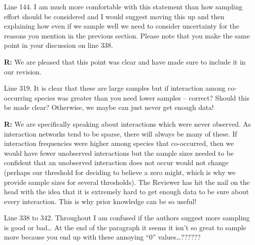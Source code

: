 \documentclass[12pt]{letter}
\newenvironment{refquote}{\bigskip \begin{it}}{\end{it}\smallskip}
\begin{document}
\begin{itemize}
		\begin{refquote}
		Line 144.  I am much more comfortable with this statement than how sampling effort should be considered and I would suggest moving this up and then explaining how even if we sample well we need to consider uncertainty for the reasons you mention in the previous section.  Please note that you make the same point in your discussion on line 338.
		\end{refquote}

		\textbf{R:} We are pleased that this point was clear and have made sure to include it in our revision.

		\begin{refquote}
		Line 319.  It is clear that these are large samples but if interaction among co-occurring species was greater than you need lower samples – correct?  Should this be made clear?  Otherwise, we maybe can just never get enough data!
		\end{refquote}

		\textbf{R:} We are specifically speaking about interactions which were never observed. As interaction networks tend to be sparse, there will always be many of these. If interaction frequencies were higher among species that co-occurred, then we would have fewer unobserved interactions but the sample sizes needed to be confident that an unobserved interaction does not occur would not change (perhaps our threshold for deciding to believe a zero might, which is why we provide sample sizes for several thresholds). The Reviewer has hit the nail on the head with the idea that it is extremely hard to get enough data to be sure about every interaction. This is why prior knowledge can be so useful!

		\begin{refquote}
		Line 338 to 342.  Throughout I am confused if the authors suggest more sampling is good or bad…  At the end of the paragraph it seems it isn’t so great to sample more because you end up with these annoying “0” values…??????
		\end{refquote}


\end{itemize}
\end{document}
